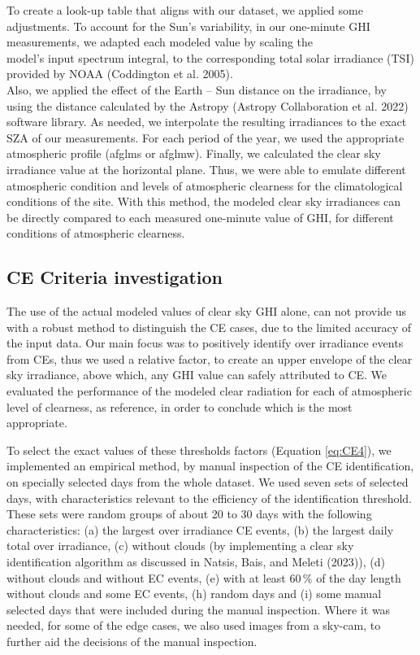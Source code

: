\documentclass[
]{article}
\begin{document}
To create a look-up table that aligns with our dataset, we applied some adjustments.
To account for the Sun's variability, in our one-minute GHI measurements,
we adapted each modeled value by scaling the\\
model's input spectrum integral, to the corresponding total solar irradiance (TSI)
provided by NOAA (Coddington et al. 2005).\\
Also, we applied the effect of the Earth -- Sun
distance on the irradiance, by using the distance calculated by the Astropy
(Astropy Collaboration et al. 2022) software library. As needed, we interpolate the resulting
irradiances to the exact SZA of our measurements. For each period of the year, we
used the appropriate atmospheric profile (afglms or afglmw). Finally, we calculated
the clear sky irradiance value at the horizontal plane. Thus, we were able to
emulate different atmospheric condition and levels of atmospheric clearness for the
climatological conditions of the site. With this method, the modeled clear sky
irradiances can be directly compared to each measured one-minute value of GHI, for
different conditions of atmospheric clearness.

\hypertarget{ce-criteria-investigation}{%
\subsection{CE Criteria investigation}\label{ce-criteria-investigation}}

The use of the actual modeled values of clear sky GHI alone, can not provide us with
a robust method to distinguish the CE cases, due to the limited accuracy of the input
data. Our main focus was to positively identify over irradiance events from CEs, thus
we used a relative factor, to create an upper envelope of the clear sky irradiance,
above which, any GHI value can safely attributed to CE. We evaluated the performance
of the modeled clear radiation for each of atmospheric level of clearness, as
reference, in order to conclude which is the most appropriate.

To select the exact values of these thresholds factors (Equation \ref{eq:CE4}), we
implemented an empirical method, by manual inspection of the CE identification, on
specially selected days from the whole dataset. We used seven sets of selected days,
with characteristics relevant to the efficiency of the identification threshold.
These sets were random groups of about 20 to 30 days with the following
characteristics:
(a) the largest over irradiance CE events,
(b) the largest daily total over irradiance,
(c) without clouds (by implementing a clear sky identification algorithm as discussed in Natsis, Bais, and Meleti (2023)),
(d) without clouds and without EC events,
(e) with at least \(60\,\%\) of the day length without clouds and some EC events,
(h) random days and
(i) some manual selected days that were included during the manual inspection.
Where it was needed, for some of the edge cases, we also used images from a sky-cam,
to further aid the decisions of the manual inspection.
\end{document}
